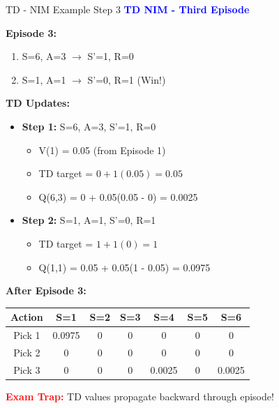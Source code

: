 \documentclass[8pt]{beamer}
\begin{document}
\begin{frame}{TD - NIM Example Step 3}
\fontsize{6.5}{7.5}\selectfont
\textcolor{blue}{\textbf{TD NIM - Third Episode}}

\textbf{Episode 3:}
\begin{enumerate}
\item S=6, A=3 $\rightarrow$ S'=1, R=0
\item S=1, A=1 $\rightarrow$ S'=0, R=1 (Win!)
\end{enumerate}

\textbf{TD Updates:}
\begin{itemize}
\item \textbf{Step 1:} S=6, A=3, S'=1, R=0
\begin{itemize}
\item V(1) = 0.05 (from Episode 1)
\item TD target = $0 + 1(0.05) = 0.05$
\item Q(6,3) = 0 + 0.05(0.05 - 0) = 0.0025
\end{itemize}
\item \textbf{Step 2:} S=1, A=1, S'=0, R=1
\begin{itemize}
\item TD target = $1 + 1(0) = 1$
\item Q(1,1) = 0.05 + 0.05(1 - 0.05) = 0.0975
\end{itemize}
\end{itemize}

\textbf{After Episode 3:}
\begin{tabular}{|c|c|c|c|c|c|c|}
\hline
Action & S=1 & S=2 & S=3 & S=4 & S=5 & S=6 \\
\hline
Pick 1 & 0.0975 & 0 & 0 & 0 & 0 & 0 \\
\hline
Pick 2 & 0 & 0 & 0 & 0 & 0 & 0 \\
\hline
Pick 3 & 0 & 0 & 0 & 0.0025 & 0 & 0.0025 \\
\hline
\end{tabular}

\textcolor{red}{\textbf{Exam Trap:}} TD values propagate backward through episode!
\end{frame}
\end{document}
